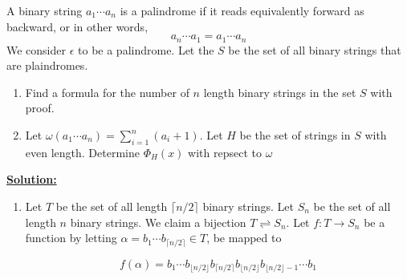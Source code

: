 \documentclass[11pt]{book}
\theoremstyle{definition}
\begin{document}
A binary string $a_1\cdots a_n$ is a palindrome if it reads equivalently forward as backward, or in other words,
$$a_n\cdots a_1 = a_1\cdots a_n$$
We consider $\epsilon$ to be a palindrome. Let the $S$ be the set of all binary strings that are plaindromes. 
\begin{enumerate}
\item Find a formula for the number of $n$ length binary strings in the set $S$ with proof.
\item Let $\omega(a_1\cdots a_n) = \sum_{i = 1}^n(a_i + 1)$. Let $H$ be the set of strings in $S$ with even length. Determine $\Phi_H(x)$ with repsect to $\omega$

\end{enumerate}

\textbf{\underline{Solution:}}
\begin{enumerate}
\item Let $T$ be the set of all length $\lceil n / 2 \rceil$ binary strings. Let $S_n$ be the set of all length $n$ binary strings. We claim a bijection $T \rightleftharpoons S_n$. Let $f \colon T \rightarrow S_n$ be a function by letting $\alpha = b_1\cdots b_{\lceil n / 2 \rceil} \in T$, be mapped to 

$$f(\alpha) = b_1\cdots b_{\lfloor n / 2 \rfloor}b_{\lceil n / 2 \rceil}b_{\lfloor n / 2 \rfloor}b_{\lfloor n / 2 \rfloor - 1}\cdots b_1$$


\end{enumerate}
\end{document}
